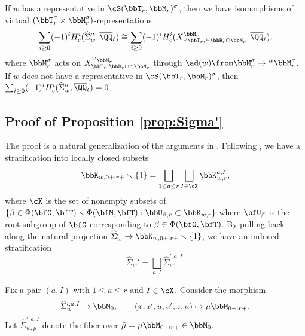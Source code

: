 \begin{proposition}\label{prop:Sigma''}
  If $w$ has a representative in $\cS(\bbT_r, \bbM_r)^\sigma$, then we have isomorphisms of virtual $(\bbT_r^\sigma \times \bbM_r^\sigma)$-representations
  \begin{equation*}
    \sum_{i \geq 0} (-1)^i H_c^i(\widehat \Sigma_w'', \overline \QQ_\ell) \cong \sum_{i \geq 0} (-1)^i H_c^i(X_{{}^w \bbT_r, {}^w \bbB_r \cap \bbM_r}^{\bbM_r}, \overline \QQ_\ell).
  \end{equation*}
  where $\bbM_r^\sigma$ acts on $X_{\bbT_r, \bbB_r \cap {}^w\bbM_r}^{{}^w \bbM_r}$ through $\ad(w) \from \bbM_r^\sigma \to {}^w \bbM_r^\sigma$.
  If $w$ does not have a representative in $\cS(\bbT_r, \bbM_r)^\sigma$, then $\sum_{i \geq 0} (-1)^i H_c^i(\widehat \Sigma_w'', \overline \QQ_\ell) = 0$.
\end{proposition}


\subsection{Proof of Proposition \ref{prop:Sigma'}}\label{subsec:Sigma' proof}

The proof is a natural generalization of the arguments in \cite{Lus04,Sta09,CI21-RT}. Following \cite[Section 3.5, esp.\ (3.7)]{CI21-RT}, we have a stratification into locally closed subsets
\begin{equation*}
  \bbK_{w,0+:r+} \smallsetminus \{1\} = \bigsqcup_{1 \leq a \leq r} \bigsqcup_{I \in \cX} \bbK_{w,r}^{a,I},
\end{equation*}
where $\cX$ is the set of nonempty subsets of $\{\beta \in \Phi(\bfG,\bfT) \smallsetminus \Phi(\bfM,\bfT) : \bbU_{\beta,r} \subset \bbK_{w,r}\}$ where $\bfU_\beta$ is the root subgroup of $\bfG$ corresponding to $\beta \in \Phi(\bfG,\bfT)$. By pulling back along the natural projection $\widehat \Sigma_w' \to \bbK_{w,0+:r+} \smallsetminus \{1\}$, we have an induced stratification
\begin{equation*}
  \widehat \Sigma_w' = \bigsqcup_{a,I} \widehat \Sigma_w^{\prime, a, I}.
\end{equation*}

Fix a pair $(a,I)$ with $1 \leq a \leq r$ and $I \in \cX$.  Consider the morphism
\begin{equation*}
  \widehat \Sigma_w^{\prime, a, I} \to \bbM_{0}, \qquad (x,x',u,u',z,\mu) \mapsto \mu \bbM_{0+:r+}.
\end{equation*}
Let $\widehat \Sigma_{w,\bar\mu}^{\prime, a, I}$ denote the fiber over $\bar \mu = \mu\bbM_{0+:r+} \in \bbM_{0}$.

